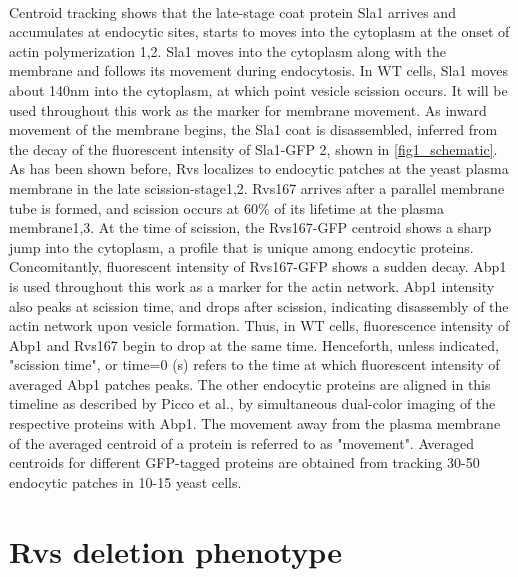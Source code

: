 \mbox{}\\
Centroid tracking shows that the late-stage coat protein Sla1 arrives and accumulates at endocytic sites, starts to moves into the cytoplasm at the onset of actin polymerization 1,2. Sla1 moves into the cytoplasm along with the membrane and follows its movement during endocytosis. In WT cells, Sla1 moves about 140nm into the cytoplasm, at which point vesicle scission occurs. It will be used throughout this work as the marker for membrane movement. As inward movement of the membrane begins, the Sla1 coat is disassembled, inferred from the decay of the fluorescent intensity of Sla1-GFP 2, shown in \ref{fig1_schematic}. As has been shown before, Rvs localizes to endocytic patches at the yeast plasma membrane in the late scission-stage1,2. Rvs167 arrives after a parallel membrane tube is formed, and scission occurs at 60\% of its lifetime at the plasma membrane1,3. At the time of scission, the Rvs167-GFP centroid shows a sharp jump into the cytoplasm, a profile that is unique among endocytic proteins. Concomitantly, fluorescent intensity of Rvs167-GFP shows a sudden decay. Abp1 is used throughout this work as a marker for the actin network. Abp1 intensity also peaks at scission time, and drops after scission, indicating disassembly of the actin network upon vesicle formation. Thus, in WT cells, fluorescence intensity of Abp1 and Rvs167 begin to drop at the same time. Henceforth, unless indicated, "scission time", or time=0 (s) refers to the time at which fluorescent intensity of averaged Abp1 patches peaks. The other endocytic proteins are aligned in this timeline as described by Picco et al., by simultaneous dual-color imaging of the respective proteins with Abp1. The movement away from the plasma membrane of the averaged centroid of a protein is referred to as "movement". Averaged centroids for different GFP-tagged proteins are obtained from tracking 30-50 endocytic patches in 10-15 yeast cells. 



\section{Rvs deletion phenotype}
\label{rvsdel}


